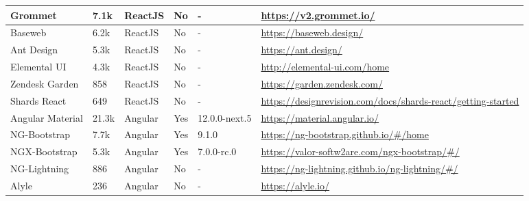 \begin{table*}[t]
\begin{tabularx}{\textwidth}{p{} |p{} | p{} | p{} | p{} |p{}  }
    Grommet                 & 7.1k                    & ReactJS               & No                & -                & \url{https://v2.grommet.io/}                                                     \\ \hline
    Baseweb                 & 6.2k                    & ReactJS               & No                & -                & \url{https://baseweb.design/}                                                    \\ \hline
    Ant Design              & 5.3k                    & ReactJS               & No                & -                & \url{https://ant.design/}                                                        \\ \hline
    Elemental UI            & 4.3k                    & ReactJS               & No                & -                & \url{http://elemental-ui.com/home }                                              \\ \hline
    Zendesk Garden          & 858                     & ReactJS               & No                & -                & \url{https://garden.zendesk.com/}                                                \\ \hline
    Shards React            & 649                     & ReactJS               & No                & -                & \url{https://designrevision.com/docs/shards-react/getting-started }              \\ \hline
    Angular Material        & 21.3k                   & Angular               & Yes               & 12.0.0-next.5    & \url{https://material.angular.io/}                                               \\ \hline
    NG-Bootstrap            & 7.7k                    & Angular               & Yes               & 9.1.0            & \url{https://ng-bootstrap.github.io/\#/home }                                    \\ \hline
    NGX-Bootstrap           & 5.3k                    & Angular               & Yes               & 7.0.0-rc.0       & \url{https://valor-softw2are.com/ngx-bootstrap/\#/ }                             \\ \hline
    NG-Lightning            & 886                     & Angular               & No                & -                & \url{https://ng-lightning.github.io/ng-lightning/\#/ }                           \\ \hline
    Alyle                   & 236                     & Angular               & No                & -                & \url{https://alyle.io/}                                                          \\ \hline

\end{tabularx}
\end{table*}
